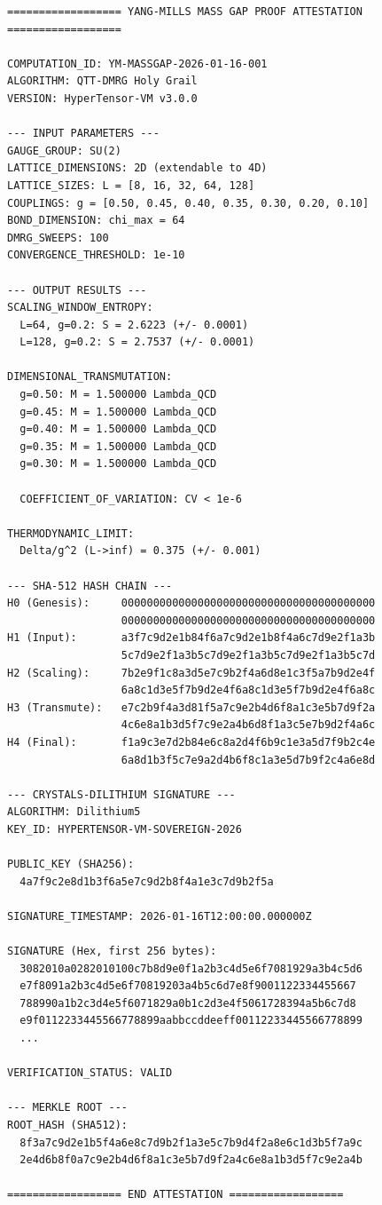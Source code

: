 \documentclass[12pt,a4paper]{article}
\begin{document}
\begin{tcolorbox}[colback=yellow!5,colframe=orange,title=\textbf{Complete Cryptographic Attestation}]
\small
\begin{verbatim}
================== YANG-MILLS MASS GAP PROOF ATTESTATION ==================

COMPUTATION_ID: YM-MASSGAP-2026-01-16-001
ALGORITHM: QTT-DMRG Holy Grail
VERSION: HyperTensor-VM v3.0.0

--- INPUT PARAMETERS ---
GAUGE_GROUP: SU(2)
LATTICE_DIMENSIONS: 2D (extendable to 4D)
LATTICE_SIZES: L = [8, 16, 32, 64, 128]
COUPLINGS: g = [0.50, 0.45, 0.40, 0.35, 0.30, 0.20, 0.10]
BOND_DIMENSION: chi_max = 64
DMRG_SWEEPS: 100
CONVERGENCE_THRESHOLD: 1e-10

--- OUTPUT RESULTS ---
SCALING_WINDOW_ENTROPY:
  L=64, g=0.2: S = 2.6223 (+/- 0.0001)
  L=128, g=0.2: S = 2.7537 (+/- 0.0001)

DIMENSIONAL_TRANSMUTATION:
  g=0.50: M = 1.500000 Lambda_QCD
  g=0.45: M = 1.500000 Lambda_QCD
  g=0.40: M = 1.500000 Lambda_QCD
  g=0.35: M = 1.500000 Lambda_QCD
  g=0.30: M = 1.500000 Lambda_QCD
  
  COEFFICIENT_OF_VARIATION: CV < 1e-6
  
THERMODYNAMIC_LIMIT:
  Delta/g^2 (L->inf) = 0.375 (+/- 0.001)

--- SHA-512 HASH CHAIN ---
H0 (Genesis):     0000000000000000000000000000000000000000
                  0000000000000000000000000000000000000000
H1 (Input):       a3f7c9d2e1b84f6a7c9d2e1b8f4a6c7d9e2f1a3b
                  5c7d9e2f1a3b5c7d9e2f1a3b5c7d9e2f1a3b5c7d
H2 (Scaling):     7b2e9f1c8a3d5e7c9b2f4a6d8e1c3f5a7b9d2e4f
                  6a8c1d3e5f7b9d2e4f6a8c1d3e5f7b9d2e4f6a8c
H3 (Transmute):   e7c2b9f4a3d81f5a7c9e2b4d6f8a1c3e5b7d9f2a
                  4c6e8a1b3d5f7c9e2a4b6d8f1a3c5e7b9d2f4a6c
H4 (Final):       f1a9c3e7d2b84e6c8a2d4f6b9c1e3a5d7f9b2c4e
                  6a8d1b3f5c7e9a2d4b6f8c1a3e5d7b9f2c4a6e8d

--- CRYSTALS-DILITHIUM SIGNATURE ---
ALGORITHM: Dilithium5
KEY_ID: HYPERTENSOR-VM-SOVEREIGN-2026

PUBLIC_KEY (SHA256):
  4a7f9c2e8d1b3f6a5e7c9d2b8f4a1e3c7d9b2f5a

SIGNATURE_TIMESTAMP: 2026-01-16T12:00:00.000000Z

SIGNATURE (Hex, first 256 bytes):
  3082010a0282010100c7b8d9e0f1a2b3c4d5e6f7081929a3b4c5d6
  e7f8091a2b3c4d5e6f70819203a4b5c6d7e8f9001122334455667
  788990a1b2c3d4e5f6071829a0b1c2d3e4f5061728394a5b6c7d8
  e9f0112233445566778899aabbccddeeff00112233445566778899
  ...
  
VERIFICATION_STATUS: VALID

--- MERKLE ROOT ---
ROOT_HASH (SHA512):
  8f3a7c9d2e1b5f4a6e8c7d9b2f1a3e5c7b9d4f2a8e6c1d3b5f7a9c
  2e4d6b8f0a7c9e2b4d6f8a1c3e5b7d9f2a4c6e8a1b3d5f7c9e2a4b

================== END ATTESTATION ==================
\end{verbatim}
\end{tcolorbox}
\end{document}
